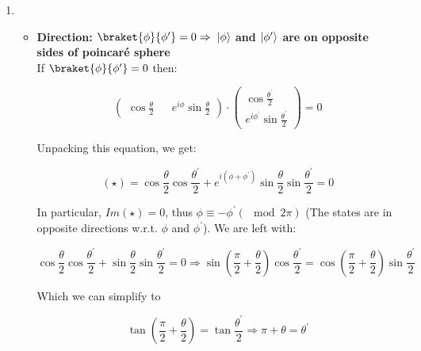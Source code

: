 \documentclass[a4paper,10pt]{hw}
\DeclarePairedDelimiter\ket{\lvert}{\rangle}
\begin{document}
\begin{enumerate}

\item

\begin{itemize}

	\item \textbf{Direction: $\braket{\phi}{\phi^\prime} = 0 \Rightarrow$ $\ket{\phi}$ and $\ket{\phi^\prime}$ are on opposite sides of poincar\'{e} sphere } \\
	
	If $\braket{\phi}{\phi^\prime} = 0$ then:
	
	$$
	\begin{pmatrix}
	\cos{\frac{\theta}{2}} && e^{i\phi}\sin{\frac{\theta}{2}}
	\end{pmatrix}
	\cdot
	\begin{pmatrix}
	\cos{\frac{\theta^\prime}{2}} \\ e^{i\phi^\prime}\sin{\frac{\theta^\prime}{2}}
	\end{pmatrix}
	=
	0
	$$

	Unpacking this equation, we get:
	
	$$
	(\star) = \cos{\frac{\theta}{2}} \cos{\frac{\theta^\prime}{2}} + e^{i(\phi + \phi^\prime)}\sin{\frac{\theta}{2}} \sin{\frac{\theta^\prime}{2}} = 0
	$$
	
	In particular, $Im(\star) = 0$, thus $\phi \equiv -\phi^\prime(\mod 2\pi)$ (The states are in opposite directions w.r.t. $\phi$ and $\phi^\prime$). We are left with:
	
	$$
	\cos{\frac{\theta}{2}} \cos{\frac{\theta^\prime}{2}} + \sin{\frac{\theta}{2}} \sin{\frac{\theta^\prime}{2}} = 0 \Rightarrow \sin\left(\frac{\pi}{2} + \frac{\theta}{2}\right)\cos{\frac{\theta^\prime}{2}} = \cos\left(\frac{\pi}{2} + \frac{\theta}{2}\right)\sin{\frac{\theta^\prime}{2}}
	$$
	
	Which we can simplify to
	
	$$
	\tan\left(\frac{\pi}{2} + \frac{\theta}{2}\right) = \tan{\frac{\theta^\prime}{2}}
	\Rightarrow
	\pi + \theta = \theta^\prime
	$$
\end{itemize}

\end{enumerate}
\end{document}

